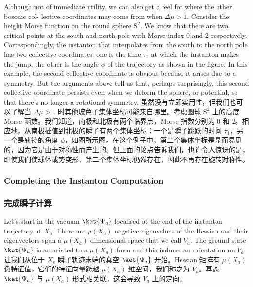 \documentclass{ctexart}
\begin{document}
\begin{paracol}{2}
Although not of immediate utility, we can also get a feel for where the other bosonic col- lective coordinates may come from when $\Delta \mu >1$. Consider the height Morse function on the round sphere $\bm{\mathrm{S}}^2$. We know that there are two critical points at the south and north pole with Morse index $0$ and $2$ respectively. Correspondingly, the instanton that interpolates from the south to the north pole has two collective coordinates: one is the time $\tau_1$ at which the instanton makes the jump, the other is the angle $\phi$ of the trajectory as shown in the figure. In this example, the second collective coordinate is obvious because it arises due to a symmetry. But the arguments above tell us that, perhaps surprisingly, this second collective coordinate persists even when we deform the sphere, or potential, so that there’s no longer a rotational symmetry.
\switchcolumn
虽然没有立即实用性，但我们也可以了解当 $\Delta \mu >1$ 时其他玻色子集体坐标可能来自哪里。考虑圆球 $\bm{\mathrm{S}}^2$ 上的高度 Morse 函数。我们知道，南极和北极有两个临界点，Morse 指数分别为 $0$ 和 $2$。相应地，从南极插值到北极的瞬子有两个集体坐标：一个是瞬子跳跃的时间 $\tau_1$，另一个是轨迹的角度 $\phi$，如图所示图。在这个例子中，第二个集体坐标是显而易见的，因为它是由于对称性而产生的。但上面的论点告诉我们，也许令人惊讶的是，即使我们使球体或势变形，第二个集体坐标仍然存在，因此不再存在旋转对称性。
\switchcolumn*

\subsubsection{Completing the Instanton Computation}
\switchcolumn
\subsubsection*{完成瞬子计算}
\switchcolumn*

Let’s start in the vacuum $\ket{\Psi_a}$ localised at the end of the instanton trajectory at $X_a$. There are $\mu(X_a)$ negative eigenvalues of the Hessian and their eigenvectors span a $\mu(X_a)$-dimensional space that we call $V_a$. The ground state $\ket{\Psi_a}$ is associated to a $\mu(X_a)$-form and this induces an orientation on $V_a$.
\switchcolumn
让我们从位于 $X_a$ 瞬子轨迹末端的真空 $\ket{\Psi_a}$ 开始。Hessian 矩阵有 $\mu(X_a)$ 负特征值，它们的特征向量跨越 $\mu(X_a)$ 维空间，我们称之为 $V_a$。基态 $\ket{\Psi_a}$ 与 $\mu(X_a)$ 形式相关联，这会导致 $V_a$ 上的定向。
\switchcolumn*


\end{paracol}
\end{document}

